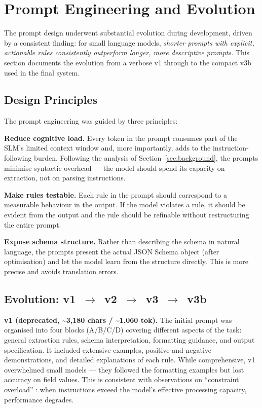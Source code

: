 \documentclass{ceurart}
\begin{document}
\section{Prompt Engineering and Evolution}
\label{sec:prompts}

The prompt design underwent substantial evolution during development, driven by a
consistent finding: for small language models, \emph{shorter prompts with explicit,
actionable rules consistently outperform longer, more descriptive prompts}.
This section documents the evolution from a verbose v1 through to the compact v3b used
in the final system.

\subsection{Design Principles}

The prompt engineering was guided by three principles:

\textbf{Reduce cognitive load.}
Every token in the prompt consumes part of the SLM's limited context window and, more
importantly, adds to the instruction-following burden.
Following the analysis of Section~\ref{sec:background}, the prompts minimise syntactic
overhead --- the model should spend its capacity on extraction, not on parsing
instructions.

\textbf{Make rules testable.}
Each rule in the prompt should correspond to a measurable behaviour in the output.
If the model violates a rule, it should be evident from the output and the rule should
be refinable without restructuring the entire prompt.

\textbf{Expose schema structure.}
Rather than describing the schema in natural language, the prompts present the actual
JSON Schema object (after optimisation) and let the model learn from the structure
directly.
This is more precise and avoids translation errors.

\subsection{Evolution: v1~$\to$~v2~$\to$~v3~$\to$~v3b}

\textbf{v1 (deprecated, {\textasciitilde}3,180 chars / {\textasciitilde}1,060 tok).}
The initial prompt was organised into four blocks (A/B/C/D) covering different aspects
of the task: general extraction rules, schema interpretation, formatting guidance, and
output specification.
It included extensive examples, positive and negative demonstrations, and detailed
explanations of each rule.
While comprehensive, v1 overwhelmed small models --- they followed the formatting
examples but lost accuracy on field values.
This is consistent with observations on ``constraint overload'' \cite{Nguyen2026}:
when instructions exceed the model's effective processing capacity, performance
degrades.
\end{document}
